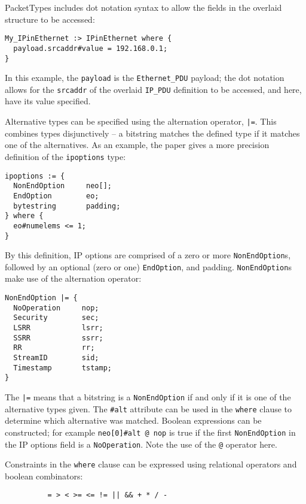 \documentclass[10pt,a4paper]{article}
\begin{document}
PacketTypes includes dot notation syntax to allow the fields in the overlaid structure to
be accessed:

\begin{verbatim}
My_IPinEthernet :> IPinEthernet where {
  payload.srcaddr#value = 192.168.0.1;
}
\end{verbatim}

In this example, the \texttt{payload} is the \texttt{Ethernet\_PDU} payload; the dot
notation allows for the \texttt{srcaddr} of the overlaid \texttt{IP\_PDU} definition to be
accessed, and here, have its value specified.

Alternative types can be specified using the alternation operator, \texttt{|=}. This
combines types disjunctively -- a bitstring matches the defined type if it matches one of
the alternatives. As an example, the paper gives a more precision definition of the
\texttt{ipoptions} type:

\begin{verbatim}
ipoptions := {
  NonEndOption     neo[];
  EndOption        eo;
  bytestring       padding;
} where {
  eo#numelems <= 1;
}
\end{verbatim}

By this definition, IP options are comprised of a zero or more \texttt{NonEndOption}s,
followed by an optional (zero or one) \texttt{EndOption}, and padding.
\texttt{NonEndOption}s make use of the alternation operator:

\begin{verbatim}
NonEndOption |= {
  NoOperation     nop;
  Security        sec;
  LSRR            lsrr;
  SSRR            ssrr;
  RR              rr;
  StreamID        sid;
  Timestamp       tstamp;
}
\end{verbatim}

The \texttt{|=} means that a bitstring is a \texttt{NonEndOption} if and only if it is one
of the alternative types given. The \texttt{\#alt} attribute can be used in the
\texttt{where} clause to determine which alternative was matched. Boolean expressions can
be constructed; for example \texttt{neo[0]\#alt @ nop} is true if the first
\texttt{NonEndOption} in the IP options field is a \texttt{NoOperation}. Note the use of
the \texttt{@} operator here.

Constraints in the \texttt{where} clause can be expressed using relational operators and
boolean combinators:
\begin{verbatim}
          = > < >= <= != || && + * / -
\end{verbatim}
\end{document}
